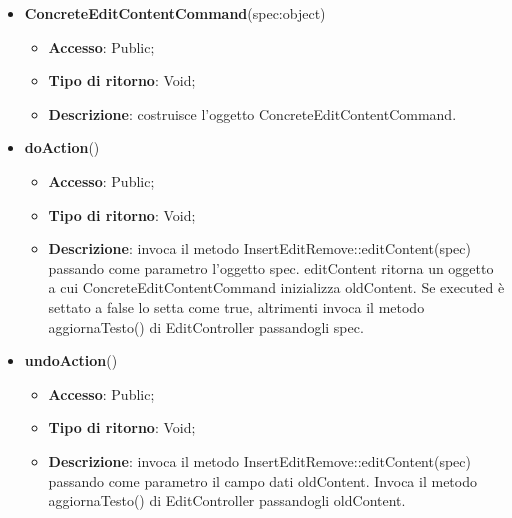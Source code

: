 {{{\begin{itemize}
\begin{itemize}
\begin{itemize}
\begin{itemize}
				\end{itemize}
			\end{itemize}
				\end{itemize}
				\end{itemize}
			\begin{itemize}
				\item \textbf{ConcreteEditContentCommand}(spec:object)
				\begin{itemize}
					\item \textbf{Accesso}: Public;
					\item \textbf{Tipo di ritorno}: Void;
					\item \textbf{Descrizione}: costruisce l’oggetto ConcreteEditContentCommand.
				\end{itemize}
				\item \textbf{doAction}()
				\begin{itemize}
					\item \textbf{Accesso}: Public;
					\item \textbf{Tipo di ritorno}: Void;
					\item \textbf{Descrizione}: invoca il metodo InsertEditRemove::editContent(spec) passando come parametro l'oggetto spec. editContent ritorna un oggetto a cui ConcreteEditContentCommand inizializza oldContent. Se executed è settato a false lo setta come true, altrimenti invoca il metodo aggiornaTesto() di EditController passandogli spec.
				\end{itemize}
				\item \textbf{undoAction}()
				\begin{itemize}
					\item \textbf{Accesso}: Public;
					\item \textbf{Tipo di ritorno}: Void;
					\item \textbf{Descrizione}: invoca il metodo InsertEditRemove::editContent(spec) passando come parametro il campo dati oldContent. Invoca il metodo aggiornaTesto() di EditController passandogli oldContent.
				\end{itemize}
			\end{itemize}
			}

}}
